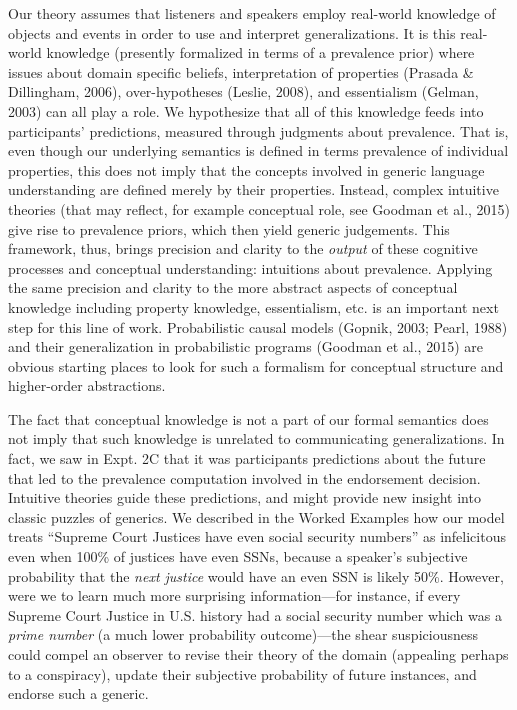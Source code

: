 \documentclass[english,,man,floatsintext]{apa6}
\theoremstyle{definition}
\theoremstyle{definition}
\theoremstyle{definition}
\theoremstyle{remark}
\begin{document}
Our theory assumes that listeners and speakers employ real-world
knowledge of objects and events in order to use and interpret
generalizations. It is this real-world knowledge (presently formalized
in terms of a prevalence prior) where issues about domain specific
beliefs, interpretation of properties (Prasada \& Dillingham, 2006),
over-hypotheses (Leslie, 2008), and essentialism (Gelman, 2003) can all
play a role. We hypothesize that all of this knowledge feeds into
participants' predictions, measured through judgments about prevalence.
That is, even though our underlying semantics is defined in terms
prevalence of individual properties, this does not imply that the
concepts involved in generic language understanding are defined merely
by their properties. Instead, complex intuitive theories (that may
reflect, for example conceptual role, see Goodman et al., 2015) give
rise to prevalence priors, which then yield generic judgements. This
framework, thus, brings precision and clarity to the \emph{output} of
these cognitive processes and conceptual understanding: intuitions about
prevalence. Applying the same precision and clarity to the more abstract
aspects of conceptual knowledge including property knowledge,
essentialism, etc. is an important next step for this line of work.
Probabilistic causal models (Gopnik, 2003; Pearl, 1988) and their
generalization in probabilistic programs (Goodman et al., 2015) are
obvious starting places to look for such a formalism for conceptual
structure and higher-order abstractions.

The fact that conceptual knowledge is not a part of our formal semantics
does not imply that such knowledge is unrelated to communicating
generalizations. In fact, we saw in Expt. 2C that it was participants
predictions about the future that led to the prevalence computation
involved in the endorsement decision. Intuitive theories guide these
predictions, and might provide new insight into classic puzzles of
generics. We described in the Worked Examples how our model treats
\enquote{Supreme Court Justices have even social security numbers} as
infelicitous even when 100\% of justices have even SSNs, because a
speaker's subjective probability that the \emph{next justice} would have
an even SSN is likely 50\%. However, were we to learn much more
surprising information---for instance, if every Supreme Court Justice in
U.S. history had a social security number which was a \emph{prime
number} (a much lower probability outcome)---the shear suspiciousness
could compel an observer to revise their theory of the domain (appealing
perhaps to a conspiracy), update their subjective probability of future
instances, and endorse such a generic.
\end{document}
